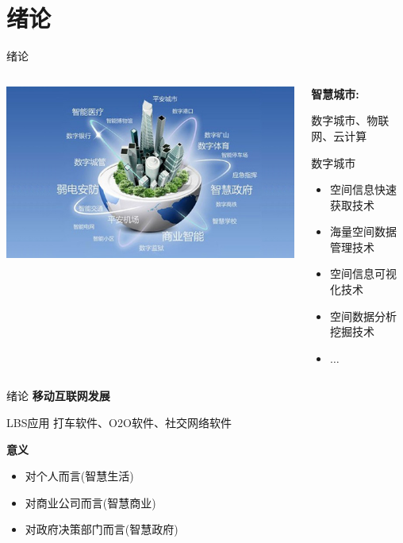 \section{绪论}

\begin{frame}{绪论}
    \begin{columns}
        \begin{column}{0.5\textwidth}
        \includegraphics[scale=0.3]{figures/smartcity.jpg}
        \end{column}

        \begin{column}{0.5\textwidth}
        \textbf{智慧城市:} 
        
        数字城市、物联网、云计算
        \vspace{2em}

        \pause
        \alert{数字城市}
        \begin{itemize}
        \item 空间信息快速获取技术
        \item 海量空间数据管理技术
        \item 空间信息可视化技术
        \item 空间数据分析挖掘技术
        \item $\ldots$
        \end{itemize}
        \end{column}
   \end{columns}
\end{frame}

\begin{frame}{绪论}
    \textbf{移动互联网发展}

    \alert{LBS应用}
    打车软件、O2O软件、社交网络软件

    \vspace{2em}
    \pause
    \textbf{意义}
    \begin{itemize}
        \pause
        \item 对个人而言(智慧生活)
        \pause
        \item 对商业公司而言(智慧商业)
        \pause
        \item 对政府决策部门而言(智慧政府)
    \end{itemize}
\end{frame}


